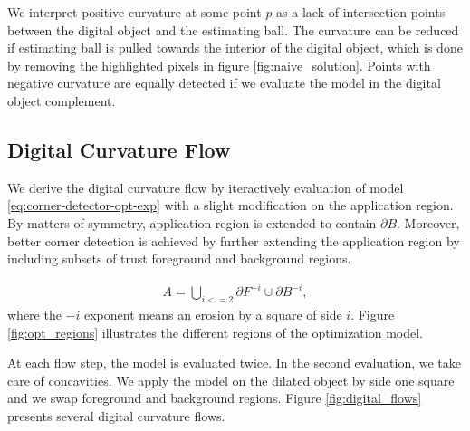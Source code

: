 \documentclass[runningheads]{llncs}
\begin{document}
We interpret positive curvature at some point $p$ as a lack of intersection points between the digital object and the estimating ball. The curvature can be reduced if estimating ball is pulled towards the interior of the digital object, which is done by removing the highlighted pixels in figure \ref{fig:naive_solution}. Points with negative curvature are equally detected if we evaluate the model in the digital object complement.

\subsection{Digital Curvature Flow}

We derive the digital curvature flow by iteractively evaluation of model \eqref{eq:corner-detector-opt-exp} with a slight modification on the application region. By matters of symmetry, application region is extended to contain $\partial B$. Moreover, better corner detection is achieved by further extending the application region by including subsets of trust foreground and background regions.

\begin{align*}
	A = \bigcup_{i<=2}{ \partial F^{-i} \cup \partial B^{-i} },
\end{align*}
where the $-i$ exponent means an erosion by a square of side $i$. Figure \ref{fig:opt_regions} illustrates the different regions of the optimization model. 

At each flow step, the model is evaluated twice. In the second evaluation, we take care of concavities. We apply the model on the dilated object by side one square and we swap foreground and background regions. Figure \ref{fig:digital_flows} presents several digital curvature flows.
\end{document}
